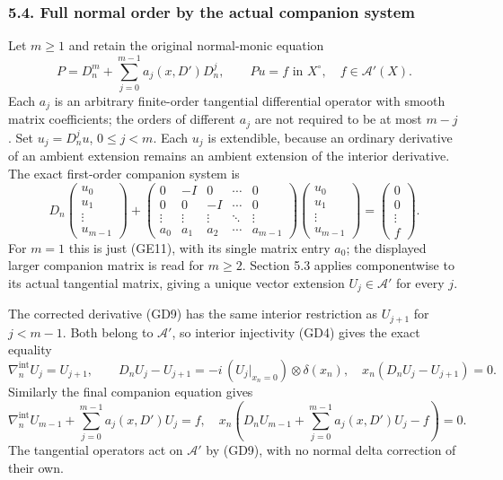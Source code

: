 \documentclass[
  11pt,
]{article}
\begin{document}
\subsubsection{5.4. Full normal order by the actual companion
system}\label{full-normal-order-by-the-actual-companion-system}

Let \(m\ge1\) and retain the original normal-monic equation \[
 P=D_n^m+\sum_{j=0}^{m-1}a_j(x,D')D_n^j,
 \qquad Pu=f\text{ in }X^\circ,
 \quad f\in\mathcal A'(X).
 \tag{GE11}
\] Each \(a_j\) is an arbitrary finite-order tangential differential
operator with smooth matrix coefficients; the orders of different
\(a_j\) are not required to be at most \(m-j\). Set \(u_j=D_n^ju\),
\(0\le j<m\). Each \(u_j\) is extendible, because an ordinary derivative
of an ambient extension remains an ambient extension of the interior
derivative. The exact first-order companion system is \[
 D_n\begin{pmatrix}u_0\\u_1\\\vdots\\u_{m-1}\end{pmatrix}
 +\begin{pmatrix}
 0&-I&0&\cdots&0\\
 0&0&-I&\cdots&0\\
 \vdots&\vdots&\vdots&\ddots&\vdots\\
 a_0&a_1&a_2&\cdots&a_{m-1}
 \end{pmatrix}
 \begin{pmatrix}u_0\\u_1\\\vdots\\u_{m-1}\end{pmatrix}
 =\begin{pmatrix}0\\0\\\vdots\\f\end{pmatrix}.
 \tag{GE12}
\] For \(m=1\) this is just (GE11), with its single matrix entry
\(a_0\); the displayed larger companion matrix is read for \(m\ge2\).
Section 5.3 applies componentwise to its actual tangential matrix,
giving a unique vector extension \(U_j\in\mathcal A'\) for every \(j\).

The corrected derivative (GD9) has the same interior restriction as
\(U_{j+1}\) for \(j<m-1\). Both belong to \(\mathcal A'\), so interior
injectivity (GD4) gives the exact equality \[
 \nabla_n^{\mathrm{int}}U_j=U_{j+1},
 \qquad D_nU_j-U_{j+1}
          =-i\,(U_j|_{x_n=0})\otimes\delta(x_n),
 \quad x_n(D_nU_j-U_{j+1})=0.
 \tag{GE13}
\] Similarly the final companion equation gives \[
 \nabla_n^{\mathrm{int}}U_{m-1}
        +\sum_{j=0}^{m-1}a_j(x,D')U_j=f,
 \quad x_n\left(D_nU_{m-1}
        +\sum_{j=0}^{m-1}a_j(x,D')U_j-f\right)=0.
 \tag{GE14}
\] The tangential operators act on \(\mathcal A'\) by (GD9), with no
normal delta correction of their own.
\end{document}
